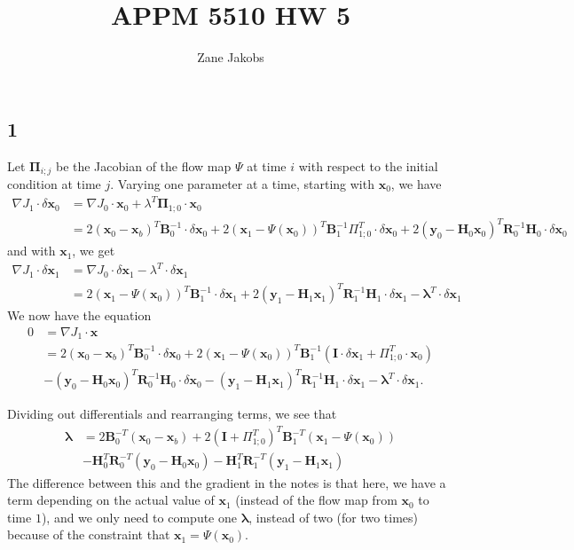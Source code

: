 \documentclass[11pt]{article}
\begin{document}
\title{APPM 5510 HW 5}
\author{Zane Jakobs}

\maketitle

\subsection*{1} Let $\bm{\Pi}_{i;j}$ be the Jacobian of the flow map $\Psi$ at time $i$ with respect to the initial condition at time $j$. Varying one parameter at a time, starting with $\bm{x}_0$, we have
\[
\begin{aligned}
\nabla J_1 \cdot \delta\bm{x}_0 &= \nabla J_0 \cdot \bm{x}_0 + \lambda^T\bm{\Pi}_{1;0} \cdot \bm{x}_0\\
&= 2(\bm{x}_0 - \bm{x}_b)^T\bm{B}_0^{-1}\cdot \delta\bm{x}_0 + 2 (\bm{x}_1 - \Psi(\bm{x}_0))^T\bm{B}_1^{-1}\Pi_{1;0}^T \cdot \delta\bm{x}_0 + 2(\bm{y}_0 - \bm{H}_0\bm{x}_0)^T\bm{R}_0^{-1}\bm{H}_0\cdot \delta\bm{x}_0
\end{aligned}
\]
and with $\bm{x}_1$, we get
\[
\begin{aligned}
\nabla J_1 \cdot \delta\bm{x}_1 &=  \nabla J_0 \cdot \delta\bm{x}_1 - \lambda^T \cdot\delta\bm{x}_1\\
&= 2(\bm{x}_1 - \Psi(\bm{x}_0))^T\bm{B}_1^{-1} \cdot\delta\bm{x}_1 + 2(\bm{y}_1 - \bm{H}_1\bm{x}_1)^T\bm{R}_1^{-1}\bm{H}_1\cdot \delta\bm{x}_1 - \bm{\lambda}^T\cdot\delta\bm{x}_1
\end{aligned}
\]
We now have the equation
\[
\begin{aligned}
0 &= \nabla J_1 \cdot\bm{x}\\
&= 2(\bm{x}_0 - \bm{x}_b)^T\bm{B}_0^{-1}\cdot \delta\bm{x}_0 + 2(\bm{x}_1 - \Psi(\bm{x}_0))^T\bm{B}_1^{-1} (\bm{I} \cdot \delta\bm{x}_1+ \Pi_{1;0}^T\cdot\bm{x}_0) \\
&- (\bm{y}_0 -  \bm{H}_0\bm{x}_0)^T\bm{R}_0^{-1}\bm{H}_0\cdot \delta\bm{x}_0 - (\bm{y}_1 - \bm{H}_1\bm{x}_1)^T\bm{R}_1^{-1}\bm{H}_1\cdot \delta\bm{x}_1 - \bm{\lambda}^T\cdot\delta\bm{x}_1.
\end{aligned}
\]

Dividing out differentials and rearranging terms, we see that
\[
\begin{aligned}
\bm{\lambda} &= 2\bm{B}_0^{-T}(\bm{x}_0 - \bm{x}_b) + 2(\bm{I} + \Pi_{1;0}^T)^T\bm{B}_1^{-T}(\bm{x}_1 - \Psi(\bm{x}_0)) \\
&- \bm{H}_0^T\bm{R}_0^{-T}(\bm{y}_0 - \bm{H}_0\bm{x}_0) - \bm{H}_1^T\bm{R}_1^{-T}(\bm{y}_1 - \bm{H}_1\bm{x}_1)
\end{aligned}
\]
The difference between this and the gradient in the notes is that here, we have a term depending on the actual value of $\bm{x}_1$ (instead of the flow map from $\bm{x}_0$ to time $1$), and we only need to compute one $\bm{\lambda}$, instead of two (for two times) because of the constraint that $\bm{x}_1 = \Psi(\bm{x}_0).$
\end{document}
